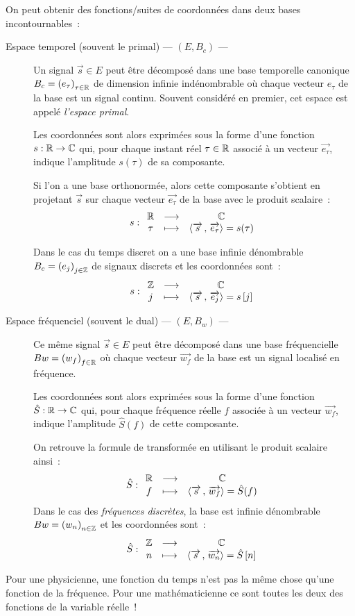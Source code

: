 On peut obtenir des fonctions/suites de coordonnées dans deux bases
incontournables~:
\begin{description}
\item[Espace temporel (souvent le primal) --- $\left(E, B_c\right)$
  ---] Un signal $\vec{s}\in E$ peut être décomposé dans une base
  temporelle canonique $B_c=\left(e_\tau\right)_{\tau\in\mathbb{R}}$ de
  dimension infinie indénombrable où chaque vecteur $e_\tau$ de la
  base est un signal continu. Souvent considéré en premier, cet espace
  est appelé \emph{l'espace primal}.

  Les coordonnées sont alors exprimées sous la forme d'une fonction
  $s:\mathbb{R}\to\mathbb{C}$ qui, pour chaque instant réel $\tau\in\mathbb{R}$ associé à un
  vecteur $\vec{e_\tau}$, indique l'amplitude $s(\tau)$ de sa
  composante.

  Si l'on a une base orthonormée, alors cette composante s'obtient en
  projetant $\vec{s}$ sur chaque vecteur $\vec{e_\tau}$ de la base
  avec le produit scalaire~:
  $$ s : \begin{array}{ccc} \mathbb{R} & \longrightarrow & \mathbb{C} \\ \tau & \longmapsto & \langle\overrightarrow{s}\,,\,\overrightarrow{e_\tau}\rangle=s(\tau) \\ \end{array}$$

  Dans le cas du temps discret on a une base infinie dénombrable
  $B_c=\left(e_j\right)_{j\in\mathbb{Z}}$ de signaux discrets et les
  coordonnées sont~:
  $$ s : \begin{array}{ccc} \mathbb{Z} & \longrightarrow & \mathbb{C} \\ j & \longmapsto & \langle\overrightarrow{s}\,,\,\overrightarrow{e_j}\rangle=s\left[j\right] \\ \end{array}$$

\item[Espace fréquenciel (souvent le dual) --- $\left(E, B_w\right)$
  ---] Ce même signal $\vec{s}\in E$ peut être décomposé dans une base
  fréquencielle $Bw=\left(w_f\right)_{f\in\mathbb{R}}$ où chaque vecteur
  $\vec{w_f}$ de la base est un signal localisé en fréquence.

  Les coordonnées sont alors exprimées sous la forme d'une fonction
  $\hat{S}:\mathbb{R}\to\mathbb{C}$ qui, pour chaque fréquence réelle $f$ associée à
  un vecteur $\vec{w_f}$, indique l'amplitude $\hat{S}(f)$ de cette
  composante.

  On retrouve la formule de transformée en utilisant le produit
  scalaire ainsi~:
  $$ \hat{S} : \begin{array}{ccc} \mathbb{R} & \longrightarrow & \mathbb{C} \\ f & \longmapsto & \langle\overrightarrow{s}\,,\,\overrightarrow{w_f}\rangle=\hat{S}(f) \\ \end{array}$$
  Dans le cas des \emph{fréquences discrètes}, la base est infinie
  dénombrable $Bw=\left(w_n\right)_{n\in\mathbb{Z}}$ et les coordonnées sont~:
  $$ \hat{S} : \begin{array}{ccc} \mathbb{Z} & \longrightarrow & \mathbb{C} \\ n & \longmapsto & \langle\overrightarrow{s}\,,\,\overrightarrow{w_n}\rangle=\hat{S}\left[n\right] \\ \end{array}$$
  
\end{description}
Pour une physicienne, une fonction du temps n'est pas la même chose
qu'une fonction de la fréquence. Pour une mathématicienne ce sont
toutes les deux des fonctions de la variable réelle~!

